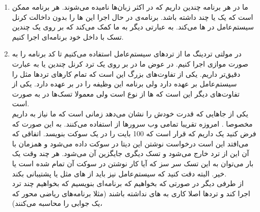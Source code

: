 \begin{enumerate}
    \item ما در هر برنامه چندین
    داریم که در اکثر زبان‌ها
    نامیده می‌شوند. هر برنامه ممکن است که یک یا چند
    داشته باشد. برنامه‌ی در حال اجرا این
    ها
    را بدون داخالت کرنل سیستم‌عامل در
    ها
    می‌کند. به عبارتی دیگر
    به ما کمک می‌کند که بر روی یک
    چندین تسک با
    داخل خود برنامه‌ای اجرا کنیم.
    \item در مولتی تردینگ ما از ترد‌های سیستم‌عامل استفاده می‌کنیم تا کد برنامه‌ را به صورت موازی
    اجرا کنیم. در عوض ما در
    بر روی یک ترد کرنل چندین
    یا به عبارت دقیق‌تر
    داریم. یکی از تفاوت‌های بزرگ این است که تمام کار‌های ترد‌ها مثل
    را سیستم‌عامل بر عهده دارد ولی برنامه این وظیفه را در
    بر عهده دارد.
    یکی از تفاوت‌های دیگر این است که
    ها
    از نوع
    \linebreak
    است ولی معمولا تسک‌ها در
    به صورت
    است.
    \\
    یکی از جا‌هایی که
    قدرت خودش را نشان می‌دهد زمانی است که ما نیاز به
    داریم مخصوصا
    .
    امروزه تقریبا تمامی وب سرور‌ها از
    استفاده می‌کنند. به این صورت که فرض کنید یک
    داریم که قرار است که 100 بایت را در یک سوکت بنویسد.
    اتفاقی که می‌افتد این است درخواست نوشتن این دیتا در سوکت داده می‌شود و همزمان با آن این
    از ترد خارج می‌شود و تسک دیگری جایگزین آن می‌شود. هر چند وقت یک بار می‌توان به این تسک سر سز که آیا
    کار نوشتن در سوکت آن تمام شده است یا خیر. البته دقت کنید که سیستم‌عامل نیز باید از
    های
    مثل
    یا
    پشتیبانی بکند.
    \\
    از طرفی دیگر در صورتی که بخواهیم که برنامه‌ای بنویسیم که بخواهیم چند ترد اجرا کند و ترد‌ها اصلا کاری به
    های
    نداشته باشند
    (مثلا برنامه‌های ریاضی محور که یک جوابی را محاسبه می‌کنند)،

\end{enumerate}
